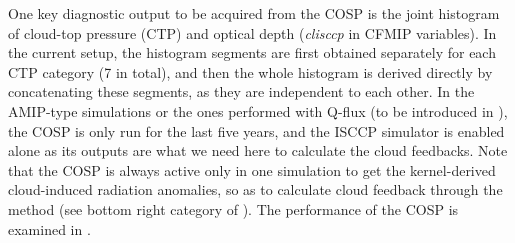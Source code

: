 One key diagnostic output to be acquired from the COSP is the joint histogram of cloud-top pressure (CTP) and optical depth (\textit{clisccp} in CFMIP variables). In the current setup, the histogram segments are first obtained separately for each CTP category (7 in total), and then the whole histogram is derived directly by concatenating these segments, as they are independent to each other. In the AMIP-type simulations or the ones performed with Q-flux (to be introduced in ), the COSP is only run for the last five years, and the ISCCP simulator is enabled alone as its outputs are what we need here to calculate the cloud feedbacks. Note that the COSP is always active only in one simulation to get the kernel-derived cloud-induced radiation anomalies, so as to calculate cloud feedback through the \cite{Gregory2004} method  (see bottom right category of ). The performance of the COSP is examined in .





